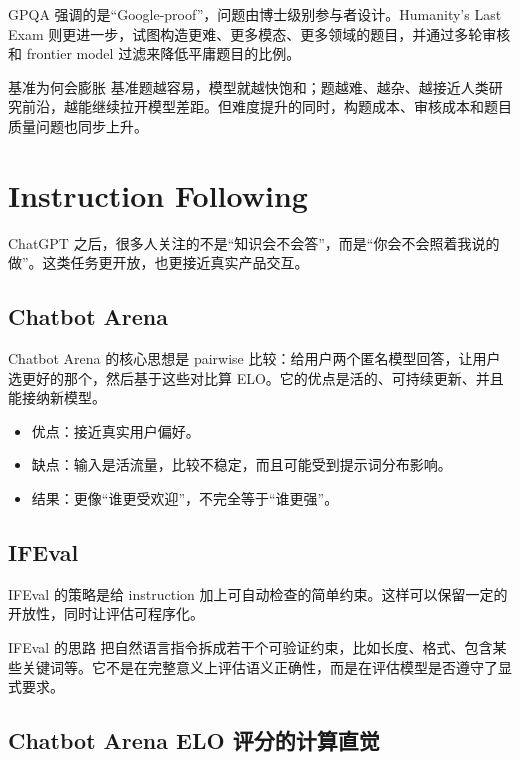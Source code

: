 \documentclass[a4paper]{article}
\begin{document}
GPQA 强调的是``Google-proof''，问题由博士级别参与者设计。Humanity's Last Exam 则更进一步，试图构造更难、更多模态、更多领域的题目，并通过多轮审核和 frontier model 过滤来降低平庸题目的比例。

\begin{importantbox}{基准为何会膨胀}
基准题越容易，模型就越快饱和；题越难、越杂、越接近人类研究前沿，越能继续拉开模型差距。但难度提升的同时，构题成本、审核成本和题目质量问题也同步上升。
\end{importantbox}

\section{Instruction Following}

ChatGPT 之后，很多人关注的不是``知识会不会答''，而是``你会不会照着我说的做''。这类任务更开放，也更接近真实产品交互。

\subsection{Chatbot Arena}

Chatbot Arena 的核心思想是 pairwise 比较：给用户两个匿名模型回答，让用户选更好的那个，然后基于这些对比算 ELO。它的优点是活的、可持续更新、并且能接纳新模型。

\begin{itemize}
    \item 优点：接近真实用户偏好。
    \item 缺点：输入是活流量，比较不稳定，而且可能受到提示词分布影响。
    \item 结果：更像“谁更受欢迎”，不完全等于“谁更强”。
\end{itemize}

\subsection{IFEval}

IFEval 的策略是给 instruction 加上可自动检查的简单约束。这样可以保留一定的开放性，同时让评估可程序化。

\begin{knowledgebox}{IFEval 的思路}
把自然语言指令拆成若干个可验证约束，比如长度、格式、包含某些关键词等。它不是在完整意义上评估语义正确性，而是在评估模型是否遵守了显式要求。
\end{knowledgebox}

\subsection{Chatbot Arena ELO 评分的计算直觉}
\end{document}
